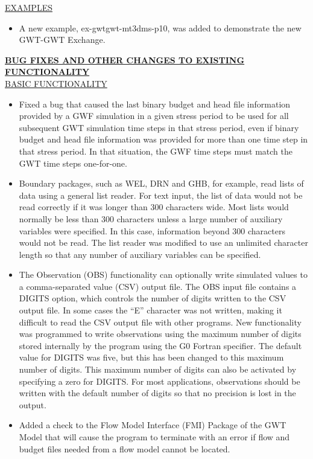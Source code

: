 \documentclass[11pt,twoside,twocolumn]{usgsreport}
\begin{document}
\begin{itemize}
\begin{itemize}
	\end{itemize}
	
	\underline{EXAMPLES}
	\begin{itemize}
	        \item A new example, ex-gwtgwt-mt3dms-p10, was added to demonstrate the new GWT-GWT Exchange.  
	\end{itemize}

	\textbf{\underline{BUG FIXES AND OTHER CHANGES TO EXISTING FUNCTIONALITY}} \\
	\underline{BASIC FUNCTIONALITY}
	\begin{itemize}
	        \item Fixed a bug that caused the last binary budget and head file information provided by a GWF simulation in a given stress period to be used for all subsequent GWT simulation time steps in that stress period, even if binary budget and head file information was provided for more than one time step in that stress period. In that situation, the GWF time steps must match the GWT time steps one-for-one.
	        \item Boundary packages, such as WEL, DRN and GHB, for example, read lists of data using a general list reader.  For text input, the list of data would not be read correctly if it was longer than 300 characters wide.  Most lists would normally be less than 300 characters unless a large number of auxiliary variables were specified.  In this case, information beyond 300 characters would not be read.  The list reader was modified to use an unlimited character length so that any number of auxiliary variables can be specified.
	        \item The Observation (OBS) functionality can optionally write simulated values to a comma-separated value (CSV) output file.  The OBS input file contains a DIGITS option, which controls the number of digits written to the CSV output file.  In some cases the ``E'' character was not written, making it difficult to read the CSV output file with other programs.  New functionality was programmed to write observations using the maximum number of digits stored internally by the program using the G0 Fortran specifier.  The default value for DIGITS was five, but this has been changed to this maximum number of digits.  This maximum number of digits can also be activated by specifying a zero for DIGITS.  For most applications, observations should be written with the default number of digits so that no precision is lost in the output.
	        \item Added a check to the Flow Model Interface (FMI) Package of the GWT Model that will cause the program to terminate with an error if flow and budget files needed from a flow model cannot be located.

\end{itemize}
\end{itemize}
\end{document}
